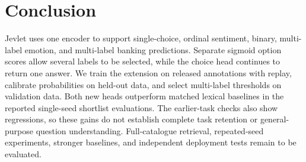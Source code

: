 \documentclass[conference]{IEEEtran}
\begin{document}
\section{Conclusion}
Jevlet uses one encoder to support single-choice, ordinal sentiment, binary, multi-label emotion, and multi-label banking predictions. Separate sigmoid option scores allow several labels to be selected, while the choice head continues to return one answer. We train the extension on released annotations with replay, calibrate probabilities on held-out data, and select multi-label thresholds on validation data. Both new heads outperform matched lexical baselines in the reported single-seed shortlist evaluations. The earlier-task checks also show regressions, so these gains do not establish complete task retention or general-purpose question understanding. Full-catalogue retrieval, repeated-seed experiments, stronger baselines, and independent deployment tests remain to be evaluated.
\end{document}
